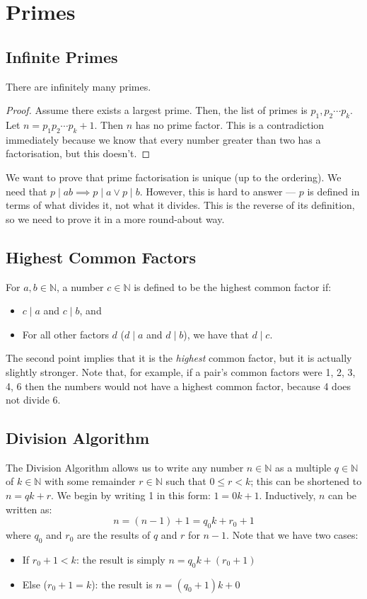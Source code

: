 \documentclass{article}
\begin{document}
\section{Primes}
\subsection{Infinite Primes}
\begin{proposition}
	There are infinitely many primes.
\end{proposition}
\begin{proof}
	Assume there exists a largest prime. Then, the list of primes is $p_1, p_2 \cdots p_k$. Let $n=p_1 p_2 \cdots p_k + 1$. Then $n$ has no prime factor. This is a contradiction immediately because we know that every number greater than two has a factorisation, but this doesn't.
\end{proof}

We want to prove that prime factorisation is unique (up to the ordering). We need that $p \mid ab \implies p \mid a \lor p \mid b$. However, this is hard to answer --- $p$ is defined in terms of what divides it, not what it divides. This is the reverse of its definition, so we need to prove it in a more round-about way.

\subsection{Highest Common Factors}
For $a, b \in \mathbb N$, a number $c \in \mathbb N$ is defined to be the highest common factor if:
\begin{itemize}
	\item $c \mid a$ and $c \mid b$, and
	\item For all other factors $d$ ($d \mid a$ and $d \mid b$), we have that $d \mid c$.
\end{itemize}
The second point implies that it is the \textit{highest} common factor, but it is actually slightly stronger. Note that, for example, if a pair's common factors were 1, 2, 3, 4, 6 then the numbers would not have a highest common factor, because 4 does not divide 6.

\subsection{Division Algorithm}
The Division Algorithm allows us to write any number $n \in \mathbb N$ as a multiple $q\in\mathbb N$ of $k\in \mathbb N$ with some remainder $r\in\mathbb N$ such that $0 \leq r < k$; this can be shortened to $n = qk + r$. We begin by writing 1 in this form: $1 = 0k + 1$. Inductively, $n$ can be written as:
\[ n = (n-1) + 1 = q_0 k + r_0 + 1 \]
where $q_0$ and $r_0$ are the results of $q$ and $r$ for $n-1$. Note that we have two cases:
\begin{itemize}
	\item If $r_0 + 1 < k$: the result is simply $n = q_0k + (r_0+1)$
	\item Else ($r_0 + 1 = k$): the result is $n = (q_0 + 1)k + 0$
\end{itemize}
\end{document}
